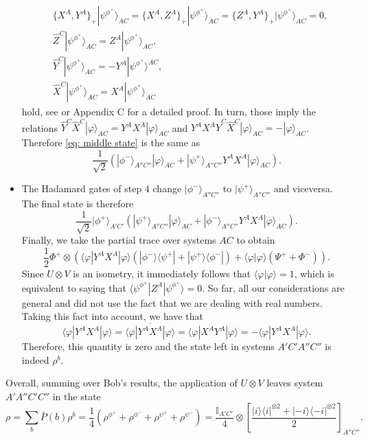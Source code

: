 \documentclass[onecolumn,prx,amsmath,amssymb,12pt]{revtex4-2}
\def\be{\begin{equation}}
\def\ee{\end{equation}}
\def\bra#1{\langle#1|} \def\ket#1{|#1\rangle}
\def\braket#1#2{\langle#1|#2\rangle}
\def\ketbra#1#2{\ket{#1}\!\bra{#2}}
\def\proj#1{\ket{#1}\!\bra{#1}}
\def\id{{\mathbb I}}
\begin{document}
\begin{appendix}
\begin{itemize}
\begin{align}
&\{X^A,Y^A\}_{+}\ket{\psi^{\phi^+}}_{{AC}}=\{X^A,Z^A\}_{+}\ket{\psi^{\phi^+}}_{{AC}}=\{Z^A,Y^A\}_{+}\ket{\psi^{\phi^+}}_{{AC}}=0,\nonumber\\
&\hat{Z}^C \ket{\psi^{\phi^+}}_{{AC}} = Z^A \ket{\psi^{\phi^+}}_{{AC}},\nonumber\\ 
&\hat{Y}^C \ket{\psi^{\phi^+}}_{{AC}} = -Y^A \ket{\psi^{\phi^+}}^{{AC}},\nonumber\\
&\hat{X}^C \ket{\psi^{\phi^+}}_{{AC}} = X^A \ket{\psi^{\phi^+}}_{{AC}}
\end{align}
\noindent hold, see \cite{self_testing} or Appendix C for a detailed proof. In turn, those imply the relations $\hat{Y}^C\hat{X}^C \ket{\varphi}_{{AC}} = Y^AX^A \ket{\varphi}_{{AC}}$ and $Y^A X^A\hat{Y}^C\hat{X}^C \ket{\varphi}_{{AC}} = - \ket{\varphi}_{{AC}}$.
Therefore \eqref{eq: middle state} is the same as 
\[
\frac{1}{\sqrt{2}} (\ket{\phi^-}_{A''C''} \ket{\varphi}_{{AC}} + \ket{\psi^+}_{A''C''} Y^A X^A \ket{\varphi}_{{AC}}).
\]

\item The Hadamard gates of step $4$ change $\ket{\phi^-}_{A''C''}$ to $\ket{\psi^+}_{A''C''}$ and viceversa. The final state is therefore
\[
\frac{1}{\sqrt{2}}\ket{\phi^+}_{A'C'}(\ket{\psi^+}_{A''C''} \ket{\varphi}_{{AC}} + \ket{\phi^-}_{A''C''} Y^A X^A \ket{\varphi}_{{AC}}).
\]
Finally, we take the partial trace over systems ${AC}$ to obtain
\[
\frac{1}{2} \Phi^+ \otimes \left(\bra{\varphi}Y^A X^A \ket{\varphi}(\ketbra{\phi^-}{\psi^+}+\ketbra{\psi^+}{\phi^-}) + \braket{\varphi}{\varphi} (\Psi^++\Phi^-)\right).
\]
Since $U\otimes V$ is an isometry, it immediately follows that $\braket{\varphi}{\varphi} = 1 $, which is equivalent to saying that $\bra{\psi^{\phi^+}}Z^A \ket{\psi^{\phi^+}}=0$. So far, all our considerations are general and did not use the fact that we are dealing with real numbers. Taking this fact into account, we have that
\[
\bra{\varphi} Y^A X^A \ket{\varphi} = \overline{\bra{\varphi} Y^A X^A \ket{\varphi}} = \bra{\varphi} X^A Y^A  \ket{\varphi} = - \bra{\varphi} Y^A X^A \ket{\varphi}.
\]
Therefore, this quantity is zero and the state left in systems $A'C'A''C''$ is indeed $\rho^b$.
\end{itemize}

Overall, summing over Bob's results, the application of ${ U}\otimes{ V}$ leaves system $A'A''C'C''$ in the state
\be
\rho=\sum_b \bar{P}(b)\rho^b=\frac{1}{4}\left(\rho^{\phi^+}+\rho^{\phi^-}+\rho^{\psi^+}+\rho^{\psi^-}\right)=\frac{\id_{A'C'}}{4}\otimes \left[\frac{\proj{i}^{\otimes 2}+\proj{-i}^{\otimes 2}}{2}\right]_{A''C''}.
\label{suma}
\ee



\end{appendix}
\end{document}
